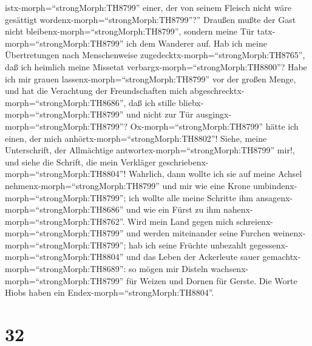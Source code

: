 istx-morph=``strongMorph:TH8799'' einer, der von seinem Fleisch nicht
wäre gesättigt wordenx-morph=``strongMorph:TH8799''?'' 
Draußen mußte der Gast nicht bleibenx-morph=``strongMorph:TH8799'',
sondern meine Tür tatx-morph=``strongMorph:TH8799'' ich dem Wanderer
auf.  Hab ich meine Übertretungen nach Menschenweise
zugedecktx-morph=``strongMorph:TH8765'', daß ich heimlich meine Missetat
verbargx-morph=``strongMorph:TH8800''?  Habe ich mir grauen
lassenx-morph=``strongMorph:TH8799'' vor der großen Menge, und hat die
Verachtung der Freundschaften mich
abgeschrecktx-morph=``strongMorph:TH8686'', daß ich stille
bliebx-morph=``strongMorph:TH8799'' und nicht zur Tür
ausgingx-morph=``strongMorph:TH8799''? 
Ox-morph=``strongMorph:TH8799'' hätte ich einen, der mich
anhörtx-morph=``strongMorph:TH8802''! Siehe, meine Unterschrift, der
Allmächtige antwortex-morph=``strongMorph:TH8799'' mir!, und siehe die
Schrift, die mein Verkläger geschriebenx-morph=``strongMorph:TH8804''!
 Wahrlich, dann wollte ich sie auf meine Achsel
nehmenx-morph=``strongMorph:TH8799'' und mir wie eine Krone
umbindenx-morph=``strongMorph:TH8799'';  ich wollte alle
meine Schritte ihm ansagenx-morph=``strongMorph:TH8686'' und wie ein
Fürst zu ihm nahenx-morph=``strongMorph:TH8762''.  Wird
mein Land gegen mich schreienx-morph=``strongMorph:TH8799'' und werden
miteinander seine Furchen weinenx-morph=``strongMorph:TH8799'';
 hab ich seine Früchte unbezahlt
gegessenx-morph=``strongMorph:TH8804'' und das Leben der Ackerleute
sauer gemachtx-morph=``strongMorph:TH8689'':  so mögen mir
Disteln wachsenx-morph=``strongMorph:TH8799'' für Weizen und Dornen für
Gerste. Die Worte Hiobs haben ein Endex-morph=``strongMorph:TH8804''.

\hypertarget{section-31}{%
\section{32}\label{section-31}}

